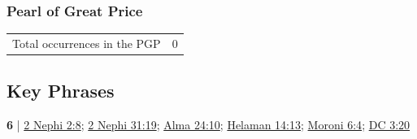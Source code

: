 	\subsubsection{Pearl of Great Price} %
		\label{MERIT-PGP}
	
		\begin{tabular}{ll}
			Total occurrences in the PGP & 0
		\end{tabular}
		
		
\subsection{Key Phrases} %
	\label{MERIT-PHRAsEs}

	\begin{compactdesc}
	
		\item[merit(s) of Christ] \textbf{6} | \hyperref[2NEPHI-2-8]{2 Nephi 2:8}; \hyperref[2NEPHI-31-19]{2 Nephi 31:19}; \hyperref[ALMA-24-10]{Alma 24:10}; \hyperref[HELAMAN-14-13]{Helaman 14:13}; \hyperref[MORONI-6-4]{Moroni 6:4}; \hyperref[DC3-20]{DC 3:20}
			
			
	\end{compactdesc}
	

